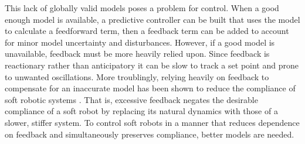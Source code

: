 This lack of globally valid models poses a problem for control.
When a good enough model   is available, a predictive controller can be built that uses the model to calculate a feedforward term, then a feedback term can be added to account for minor model uncertainty and disturbances.
However, if a good model is unavailable, feedback must be more heavily relied upon.
Since feedback is reactionary rather than anticipatory it can be slow to track a set point and prone to unwanted oscillations.
More troublingly, relying heavily on feedback to compensate for an inaccurate model has been shown to reduce the compliance of soft robotic systems \cite{della2017controlling}.
That is, excessive feedback negates the desirable compliance of a soft robot by replacing its natural dynamics with those of a slower, stiffer system.
To control soft robots in a manner that reduces dependence on feedback and simultaneously preserves compliance, better models are needed.

